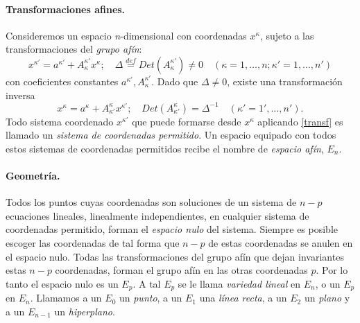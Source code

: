 \documentclass{article}
\theoremstyle{definition} \newtheorem{defi}{Definici\'on}
\theoremstyle{definition} \newtheorem{teo}{Teorema}
\theoremstyle{definition} \newtheorem{cor}{Corolario}
\begin{document}
\paragraph{Transformaciones afines.} Consideremos un espacio \emph{n}-dimensional con coordenadas $x^\kappa$, sujeto a las transformaciones del \emph{grupo af\'in}:
\begin{equation}
x^{\kappa'}=a^{\kappa'}+A_{\kappa}^{\kappa'}x^{\kappa}; \quad \Delta \stackrel{def}{=}Det(A_{\kappa}^{\kappa'}) \ne 0 \quad (\kappa=1,\dots ,n; \kappa'=1,\dots,n') \label{transf}
\end{equation}
con coeficientes constantes $a^{\kappa'},A_{\kappa}^{\kappa'}$. Dado que $\Delta \ne 0$, existe una transformaci\'on inversa
\begin{equation}
x^{\kappa}=a^{\kappa}+A_{\kappa'}^{\kappa}x^{\kappa'}; \quad Det(A_{\kappa'}^{\kappa}) = \Delta^{-1} \quad (\kappa'=1',\dots,n').
\end{equation}
Todo sistema coordenado $x^{\kappa'}$ que puede formarse desde $x^{\kappa}$ aplicando \eqref{transf} es llamado un \emph{sistema de coordenadas permitido}.
Un espacio equipado con todos estos sistemas de coordenadas permitidos recibe el nombre de \emph{espacio af\'in}, $E_n$.

\paragraph{Geometr\'ia.}
Todos los puntos cuyas coordenadas son soluciones de un sistema de $n-p$ ecuaciones lineales, linealmente independientes, en cualquier sistema de coordenadas permitido, forman el \emph{espacio nulo} del sistema. Siempre es posible escoger las coordenadas de tal forma que $n-p$ de estas coordenadas se anulen en el espacio nulo. Todas las transformaciones del grupo af\'in que dejan invariantes estas $n-p$ coordenadas, forman el grupo af\'in en las otras coordenadas $p$. Por lo tanto el espacio nulo es un $E_p$. A tal $E_p$ se le llama \emph{variedad lineal} en $E_n$, o un $E_p$ en $E_n$. Llamamos a un $E_0$ un \emph{punto}, a un $E_1$ una \emph{l\'inea recta}, a un $E_2$ un \emph{plano} y a un $E_{n-1}$ un \emph{hiperplano}.
\end{document}
